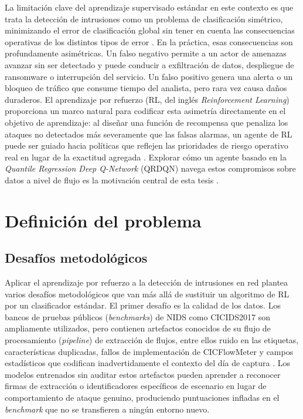 La limitación clave del aprendizaje supervisado estándar en este contexto es que trata la detección de intrusiones como un problema de clasificación simétrico, minimizando el error de clasificación global sin tener en cuenta las consecuencias operativas de los distintos tipos de error \parencite{Axelsson1999BaseRate}. En la práctica, esas consecuencias son profundamente asimétricas. Un falso negativo permite a un actor de amenazas avanzar sin ser detectado y puede conducir a exfiltración de datos, despliegue de ransomware o interrupción del servicio. Un falso positivo genera una alerta o un bloqueo de tráfico que consume tiempo del analista, pero rara vez causa daños duraderos. El aprendizaje por refuerzo (RL, del inglés \emph{Reinforcement Learning}) proporciona un marco natural para codificar esta asimetría directamente en el objetivo de aprendizaje: al diseñar una función de recompensa que penaliza los ataques no detectados más severamente que las falsas alarmas, un agente de RL puede ser guiado hacia políticas que reflejen las prioridades de riesgo operativo real en lugar de la exactitud agregada \parencite{SuttonBarto2018RL,Lee2002CostSensitiveIDS}. Explorar cómo un agente basado en la \emph{Quantile Regression Deep Q-Network} (QRDQN) navega estos compromisos sobre datos a nivel de flujo es la motivación central de esta tesis \parencite{Dabney2018QRDQN}.

\section{Definición del problema}

\subsection{Desafíos metodológicos}
Aplicar el aprendizaje por refuerzo a la detección de intrusiones en red plantea varios desafíos metodológicos que van más allá de sustituir un algoritmo de RL por un clasificador estándar. El primer desafío es la calidad de los datos. Los bancos de pruebas públicos (\emph{benchmarks}) de NIDS como CICIDS2017 son ampliamente utilizados, pero contienen artefactos conocidos de su flujo de procesamiento (\emph{pipeline}) de extracción de flujos, entre ellos ruido en las etiquetas, características duplicadas, fallos de implementación de CICFlowMeter y campos estadísticos que codifican inadvertidamente el contexto del día de captura \parencite{Ring2019DatasetSurvey,Engelen2021CICIDSIssues,Lanvin2023Errors}. Los modelos entrenados sin auditar estos artefactos pueden aprender a reconocer firmas de extracción o identificadores específicos de escenario en lugar de comportamiento de ataque genuino, produciendo puntuaciones infladas en el \emph{benchmark} que no se transfieren a ningún entorno nuevo.

